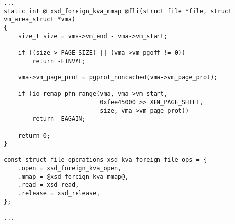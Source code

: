 \begin{lstlisting}[caption=Added file interface for mapping DomU xenstore interface page into userspace in drivers/xen/xenfs/xenstored.c file, label={xvd_foreign},frame=single,style=base]
...
static int @ xsd_foreign_kva_mmap @fli(struct file *file, struct vm_area_struct *vma)
{
    size_t size = vma->vm_end - vma->vm_start;

    if ((size > PAGE_SIZE) || (vma->vm_pgoff != 0))
        return -EINVAL;
        
    vma->vm_page_prot = pgprot_noncached(vma->vm_page_prot);

    if (io_remap_pfn_range(vma, vma->vm_start,
                           0xfee45000 >> XEN_PAGE_SHIFT,
                           size, vma->vm_page_prot))
        return -EAGAIN; 

    return 0;
}

const struct file_operations xsd_kva_foreign_file_ops = {
    .open = xsd_foreign_kva_open,
    .mmap = @xsd_foreign_kva_mmap@,
    .read = xsd_read,
    .release = xsd_release,
};

...
\end{lstlisting}



